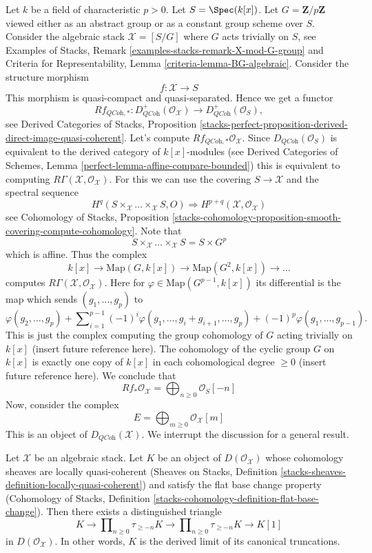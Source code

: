 \noindent
Let $k$ be a field of characteristic $p > 0$. Let $S = \Spec(k[x])$.
Let $G = \mathbf{Z}/p\mathbf{Z}$ viewed either as an abstract group
or as a constant group scheme over $S$. Consider the algebraic stack
$\mathcal{X} = [S/G]$ where $G$ acts trivially on $S$, see
Examples of Stacks, Remark \ref{examples-stacks-remark-X-mod-G-group}
and
Criteria for Representability, Lemma \ref{criteria-lemma-BG-algebraic}.
Consider the structure morphism
$$
f : \mathcal{X} \longrightarrow S
$$
This morphism is quasi-compact and quasi-separated. Hence we get a functor
$$
Rf_{\textit{QCoh}, *} :
D^{+}_{\textit{QCoh}}(\mathcal{O}_\mathcal{X})
\longrightarrow
D^{+}_{\textit{QCoh}}(\mathcal{O}_S),
$$
see 
Derived Categories of Stacks, Proposition
\ref{stacks-perfect-proposition-derived-direct-image-quasi-coherent}.
Let's compute $Rf_{\textit{QCoh}, *}\mathcal{O}_\mathcal{X}$.
Since $D_{\textit{QCoh}}(\mathcal{O}_S)$ is equivalent to
the derived category of $k[x]$-modules (see
Derived Categories of Schemes, Lemma
\ref{perfect-lemma-affine-compare-bounded})
this is equivalent to computing
$R\Gamma(\mathcal{X}, \mathcal{O}_\mathcal{X})$.
For this we can use the covering $S \to \mathcal{X}$ and the spectral
sequence
$$
H^q(S \times_\mathcal{X} \ldots \times_\mathcal{X} S, O)
\Rightarrow H^{p + q}(\mathcal{X}, \mathcal{O}_\mathcal{X})
$$
see
Cohomology of Stacks, Proposition
\ref{stacks-cohomology-proposition-smooth-covering-compute-cohomology}.
Note that
$$
S \times_\mathcal{X} \ldots \times_\mathcal{X} S = S \times G^p
$$
which is affine. Thus the complex
$$
k[x] \to \text{Map}(G, k[x]) \to \text{Map}(G^2, k[x]) \to \ldots
$$
computes $R\Gamma(\mathcal{X}, \mathcal{O}_\mathcal{X})$.
Here for $\varphi \in \text{Map}(G^{p - 1}, k[x])$ its differential is
the map which sends $(g_1, \ldots, g_p)$ to
$$
\varphi(g_2, \ldots, g_p) +
\sum\nolimits_{i = 1}^{p - 1}
(-1)^i\varphi(g_1, \ldots, g_i + g_{i + 1}, \ldots, g_p)
+ (-1)^p\varphi(g_1, \ldots, g_{p - 1}).
$$
This is just the complex computing the group cohomology of $G$ acting
trivially on $k[x]$ (insert future reference here). The cohomology of
the cyclic group $G$ on $k[x]$ is exactly one copy of $k[x]$ in each
cohomological degree $\geq 0$ (insert future reference here). We conclude
that
$$
Rf_*\mathcal{O}_\mathcal{X} = \bigoplus\nolimits_{n \geq 0} \mathcal{O}_S[-n]
$$
Now, consider the complex
$$
E = \bigoplus\nolimits_{m \geq 0} \mathcal{O}_\mathcal{X}[m]
$$
This is an object of $D_{\textit{QCoh}}(\mathcal{X})$. We interrupt the
discussion for a general result.

\begin{lemma}
\label{lemma-is-limit}
Let $\mathcal{X}$ be an algebraic stack. Let $K$ be an object of
$D(\mathcal{O}_\mathcal{X})$ whose cohomology sheaves are locally
quasi-coherent (Sheaves on Stacks, Definition
\ref{stacks-sheaves-definition-locally-quasi-coherent})
and satisfy the flat base change property (Cohomology of Stacks,
Definition \ref{stacks-cohomology-definition-flat-base-change}).
Then there exists a distinguished triangle
$$
K \to
\prod\nolimits_{n \geq 0} \tau_{\geq -n} K \to
\prod\nolimits_{n \geq 0} \tau_{\geq -n} K \to K[1]
$$
in $D(\mathcal{O}_\mathcal{X})$. In other words, $K$ is the derived
limit of its canonical truncations.
\end{lemma}

